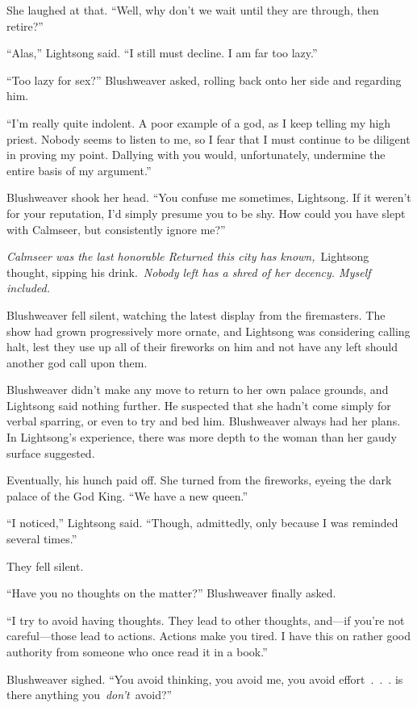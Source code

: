 She laughed at that. “Well, why don’t we wait until they are through, then retire?”

“Alas,” Lightsong said. “I still must decline. I am far too lazy.”

“Too lazy for sex?” Blushweaver asked, rolling back onto her side and regarding him.

“I’m really quite indolent. A poor example of a god, as I keep telling my high priest. Nobody seems to listen to me, so I fear that I must continue to be diligent in proving my point. Dallying with you would, unfortunately, undermine the entire basis of my argument.”

Blushweaver shook her head. “You confuse me sometimes, Lightsong. If it weren’t for your reputation, I’d simply presume you to be shy. How could you have slept with Calmseer, but consistently ignore me?”

\textit{Calmseer was the last honorable Returned this city has known,}~Lightsong thought, sipping his drink.~\textit{Nobody left has a shred of her decency. Myself included.}

Blushweaver fell silent, watching the latest display from the firemasters. The show had grown progressively more ornate, and Lightsong was considering calling halt, lest they use up all of their fireworks on him and not have any left should another god call upon them.

Blushweaver didn’t make any move to return to her own palace grounds, and Lightsong said nothing further. He suspected that she hadn’t come simply for verbal sparring, or even to try and bed him. Blushweaver always had her plans. In Lightsong’s experience, there was more depth to the woman than her gaudy surface suggested.

Eventually, his hunch paid off. She turned from the fireworks, eyeing the dark palace of the God King. “We have a new queen.”

“I noticed,” Lightsong said. “Though, admittedly, only because I was reminded several times.”

They fell silent.

“Have you no thoughts on the matter?” Blushweaver finally asked.

“I try to avoid having thoughts. They lead to other thoughts, and—if you’re not careful—those lead to actions. Actions make you tired. I have this on rather good authority from someone who once read it in a book.”

Blushweaver sighed. “You avoid thinking, you avoid me, you avoid effort~.~.~. is there anything you~\textit{don’t}~avoid?”

